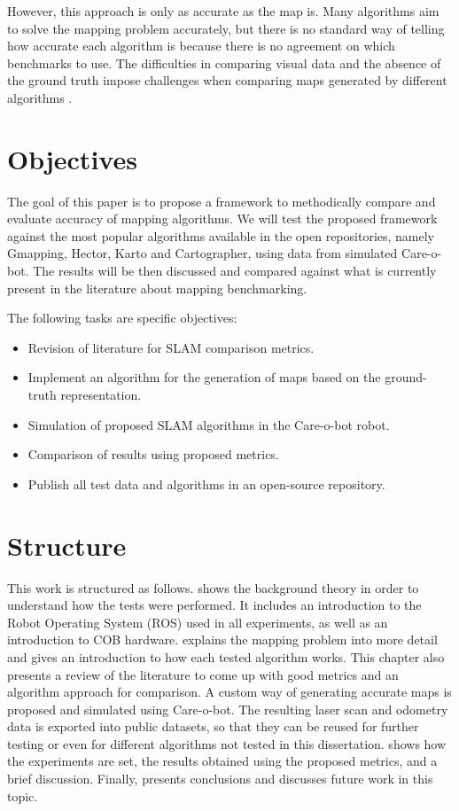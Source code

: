However, this approach is only as accurate as the map is. Many algorithms aim to solve the mapping problem accurately, but there is no standard way of telling how accurate each algorithm is because there is no agreement on which benchmarks to use. The difficulties in comparing visual data and the absence of the ground truth impose challenges when comparing maps generated by different algorithms \cite{amigoni2007good}.

\section{Objectives}

The goal of this paper is to propose a framework to methodically compare and evaluate accuracy of mapping algorithms. We will test the proposed framework against the most popular algorithms available in the open repositories, namely Gmapping, Hector, Karto and Cartographer, using data from simulated Care-o-bot. The results will be then discussed and compared against what is currently present in the literature about mapping benchmarking. 

The following tasks are specific objectives:

\begin{itemize}
    \item Revision of literature for SLAM comparison metrics.
    \item Implement an algorithm for the generation of maps based on the ground-truth representation.
    \item Simulation of proposed SLAM algorithms in the Care-o-bot robot.
    \item Comparison of results using proposed metrics.
    \item Publish all test data and algorithms in an open-source repository.
\end{itemize}


\section{Structure}

This work is structured as follows.  shows the background theory in order to understand how the tests were performed. It includes an introduction to the Robot Operating System (ROS) used in all experiments, as well as an introduction to COB hardware.  explains the mapping problem into more detail and gives an introduction to how each tested algorithm works. This chapter also presents a review of the literature to come up with good metrics and an algorithm approach for comparison. A custom way of generating accurate maps is proposed and simulated using Care-o-bot. The resulting laser scan and odometry data is exported into public datasets, so that they can be reused for further testing or even for different algorithms not tested in this dissertation.  shows how the experiments are set, the results obtained using the proposed metrics, and a brief discussion. Finally,  presents conclusions and discusses future work in this topic.

